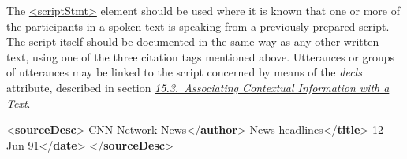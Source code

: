 The \hyperref[TEI.scriptStmt]{<scriptStmt>} element should be used where it is known that one or more of the participants in a spoken text is speaking from a previously prepared script. The script itself should be documented in the same way as any other written text, using one of the three citation tags mentioned above. Utterances or groups of utterances may be linked to the script concerned by means of the {\itshape decls} attribute, described in section \textit{\hyperref[CCAS]{15.3.\ Associating Contextual Information with a Text}}. \par\bgroup{}\exampleFont \begin{shaded}\noindent\mbox{}{<\textbf{sourceDesc}>}\mbox{}\newline 
{}\mbox{}\newline 
\hspace*{1em}\mbox{}\newline 
\hspace*{1em}\hspace*{1em}CNN Network News{</\textbf{author}>}\mbox{}\newline 
\hspace*{1em}\hspace*{1em}News headlines{</\textbf{title}>}\mbox{}\newline 
\hspace*{1em}\hspace*{1em}12 Jun 91{</\textbf{date}>}\mbox{}\newline 
\hspace*{1em}\mbox{}\newline 
{}\mbox{}\newline 
{</\textbf{sourceDesc}>}\end{shaded}\egroup\par \par
